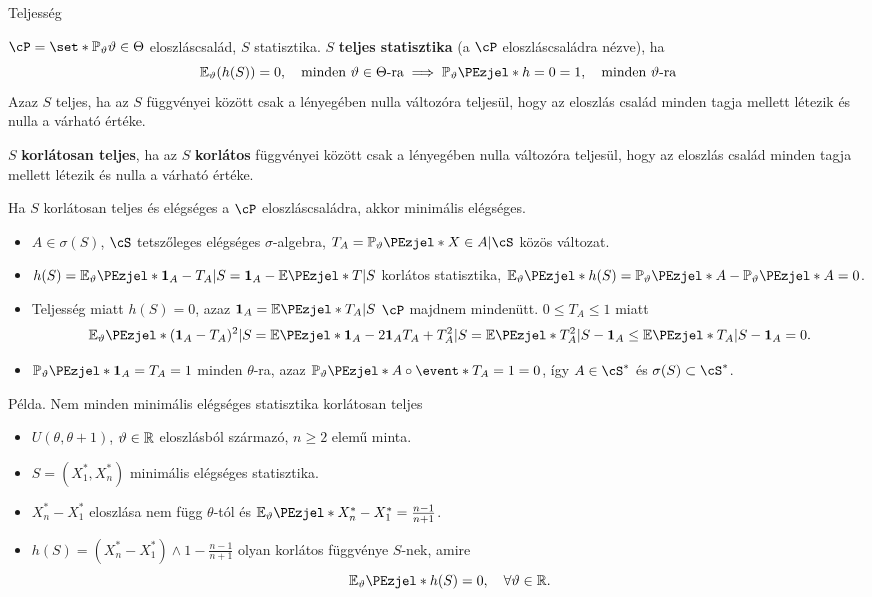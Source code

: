 \documentclass[aspectratio=169,notheorems,9pt,\option]{beamer}
\begin{document}
\begin{frame}{Teljesség}
  \begin{df}
    $\cP=\set*{\P[\theta]}{\theta\in\Theta}$ eloszláscsalád, 
    $S$ statisztika. $S$ \textbf{teljes statisztika} (a $\cP$ eloszláscsaládra nézve), ha 
    \begin{displaymath}
      \E[\theta](h(S))=0,\quad\text{minden $\theta\in\Theta$-ra}\implies \P[\theta]{h=0}=1,\quad\text{minden $\theta$-ra}
    \end{displaymath} 
    Azaz $S$ teljes, ha az $S$ függvényei között csak a lényegében nulla változóra teljesül, hogy  
    az eloszlás család minden tagja mellett létezik és nulla a várható értéke.

    $S$ \textbf{korlátosan teljes}, ha az $S$ \textbf{korlátos} függvényei között csak a 
    lényegében nulla változóra teljesül, hogy  
    az eloszlás család minden tagja mellett létezik és nulla a várható értéke.
  \end{df}
  \begin{theorem}
    Ha $S$ korlátosan teljes és elégséges a $\cP$ eloszláscsaládra, akkor minimális elégséges. 
  \end{theorem}
  \begin{itemize}
    \item $A\in\sigma(S)$, $\cS$ tetszőleges elégséges $\sigma$-algebra, $T_A=\P[\theta]{X\in A|\cS}$ közös változat.
    \item $h(S)=\E[\theta]{\I[A]-T_A|S}=\I[A]-\E{T|S}$ korlátos statisztika, $\E[\theta]{h(S)}=\P[\theta]{A}-\P[\theta]{A}=0$.
    \item Teljesség miatt $h(S)=0$, azaz $\I[A]=\E{T_A|S}$ $\cP$ majdnem mindenütt. $0\leq T_A\leq 1$ miatt
    \begin{displaymath}
      \E[\theta]{(\I[A]-T_A)^2|S}=\E{\I[A]-2\I[A]T_A+T_A^2|S}= \E{T_A^2|S}-\I[A]\leq\E{T_A|S}-\I[A]=0.
    \end{displaymath}
    \item $\P[\theta]{\I[A]=T_A}=1$ minden $\theta$-ra, 
    azaz $\P[\theta]{A\circ \event*{T_A=1}}=0$, így $A\in\cS^*$ és $\sigma(S)\subset\cS^*$.
  \end{itemize}  
\end{frame}


\begin{frame}{Példa. Nem minden minimális elégséges statisztika korlátosan teljes}
  \begin{itemize}
    \item $U(\theta,\theta+1)$, $\vartheta\in\mathbb{R}$ eloszlásból származó, $n\geq2$ elemű minta.
    \item $S=(X_1^*,X_n^*)$ minimális elégséges statisztika.
    \item $X_n^*-X_1^*$ eloszlása nem függ $\theta$-tól és $\E[\theta]{X_n^*-X_1^*}=\frac{n-1}{n+1}$.
    \item $h(S)=(X_n^*-X_1^*)\wedge1-\frac{n-1}{n+1}$ olyan korlátos függvénye $S$-nek, amire
    \begin{displaymath}
      \E[\theta]{h(S)}=0,\quad\forall \theta\in\real.
    \end{displaymath}
  \end{itemize}
\end{frame}
\end{document}
